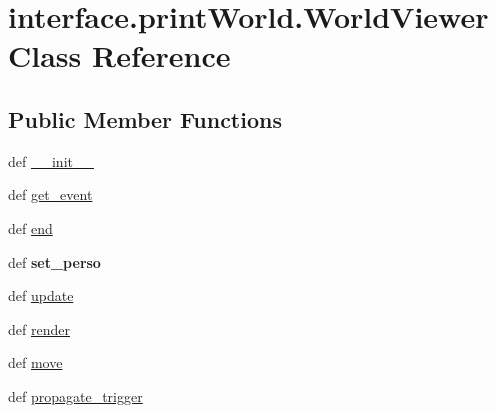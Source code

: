 \hypertarget{classinterface_1_1print_world_1_1_world_viewer}{\section{interface.\-print\-World.\-World\-Viewer \-Class \-Reference}
\label{classinterface_1_1print_world_1_1_world_viewer}
}
\subsection*{\-Public \-Member \-Functions}
\begin{DoxyCompactItemize}
\item 
def \hyperlink{classinterface_1_1print_world_1_1_world_viewer_a29df52052f8f790a3e1308d102210186}{\-\_\-\-\_\-init\-\_\-\-\_\-}
\item 
def \hyperlink{classinterface_1_1print_world_1_1_world_viewer_adada0d39c5e5f93da8d50722a04e7b92}{get\-\_\-event}
\item 
def \hyperlink{classinterface_1_1print_world_1_1_world_viewer_a060018a5214380bf5e539a8742a34201}{end}
\item 
\hypertarget{classinterface_1_1print_world_1_1_world_viewer_a6fe7808a1e9b09c56d1838ff36a3f8f2}{def {\bfseries set\-\_\-perso}}\label{classinterface_1_1print_world_1_1_world_viewer_a6fe7808a1e9b09c56d1838ff36a3f8f2}

\item 
def \hyperlink{classinterface_1_1print_world_1_1_world_viewer_a9cc6b5953ef4bfcfca631b6a94554cac}{update}
\item 
def \hyperlink{classinterface_1_1print_world_1_1_world_viewer_a16f9b59c20fd0e54125da6d4cbcc373e}{render}
\item 
def \hyperlink{classinterface_1_1print_world_1_1_world_viewer_a29cbfc89a67d46a31ca889cf481d5e2f}{move}
\item 
def \hyperlink{classinterface_1_1print_world_1_1_world_viewer_a14fd62fb5ee0b63011028e1e84cf19f4}{propagate\-\_\-trigger}
\end{DoxyCompactItemize}
